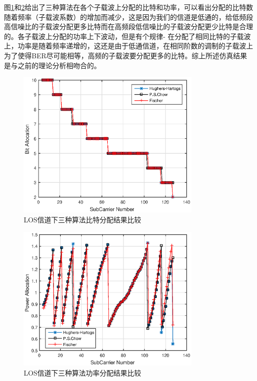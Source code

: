 图\ref{fig:loadedBit}和\ref{fig:loadedPower}给出了三种算法在各个子载波上分配的比特和功率，可以看出分配的比特数随着频率（子载波系数）的增加而减少，这是因为我们的信道是低通的，给低频段高信噪比的子载波分配更多比特而在高频段低信噪比的子载波分配更少比特是合理的。各子载波上分配的功率上下波动，但是有个规律- 在分配了相同比特的子载波上，功率是随着频率递增的，这还是由于低通信道，在相同阶数的调制的子载波上为了使得BER尽可能相等，高频的子载波要分配更多的比特。综上所述仿真结果是与之前的理论分析相吻合的。
\begin{figure}[htbp]
\centering
\includegraphics[width=0.8\textwidth]{figures/chapter-4/loadedBit.eps}
\caption{LOS信道下三种算法比特分配结果比较}
\label{fig:loadedBit}
\end{figure}

\begin{figure}[htbp]
\centering
\includegraphics[width=0.8\textwidth]{figures/chapter-4/loadedPower.eps}
\caption{LOS信道下三种算法功率分配结果比较}
\label{fig:loadedPower}
\end{figure}
